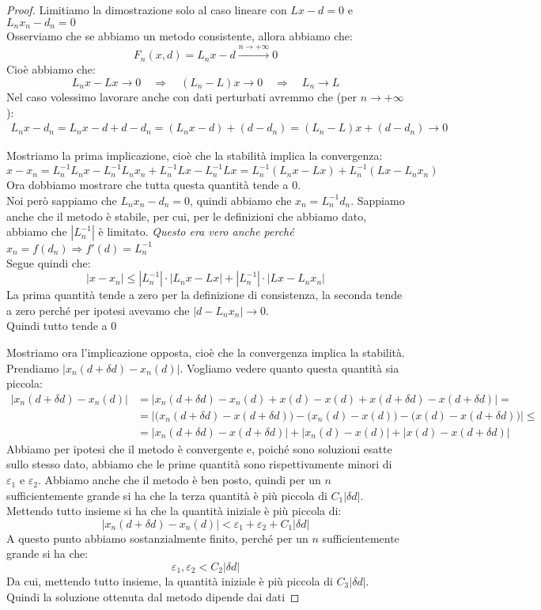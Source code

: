 \documentclass[11pt,a4paper,twoside]{article}
\newcommand{\vareps}{\varepsilon}
\theoremstyle{definition}
\begin{document}
\begin{proof}
	Limitiamo la dimostrazione solo al caso lineare con $Lx-d = 0$ e $L_nx_n - d_n = 0$\\
	Osserviamo che se abbiamo un metodo consistente, allora abbiamo che:
	\[ F_n(x, d) = L_n x - d \xrightarrow{n \to + \infty} 0 \]
	Cioè abbiamo che:
	\[ L_nx - Lx \to 0\quad \Rightarrow \quad (L_n - L)x \to 0 \quad \Rightarrow \quad L_n \to L \]
	Nel caso volessimo lavorare anche con dati perturbati avremmo che (per $n \to +\infty$):
	\begin{align*}
		L_nx - d_n = L_nx -d +d -d_n = (L_nx - d) + (d-d_n) = (L_n - L)x + (d-d_n) \to 0
	\end{align*}

	Mostriamo la prima implicazione, cioè che la stabilità implica la convergenza:
	\[ x-x_n = L^{-1}_nL_nx - L^{-1}_nL_nx_n + L^{-1}_nLx - L_n^{-1}Lx = L^{-1}_n(L_nx - Lx) + L^{-1}_n(Lx - L_nx_n)\]
	Ora dobbiamo mostrare che tutta questa quantità tende a $0$.\\
	Noi però sappiamo che $L_nx_n - d_n = 0$, quindi abbiamo che $x_n = L^{-1}_nd_n$. Sappiamo anche che il metodo è stabile, per cui, per le definizioni che abbiamo dato, abbiamo che $|L_n^{-1}|$ è limitato.
	\textit{Questo era vero anche perché }$x_n = f(d_n) \Rightarrow f'(d) = L^{-1}_n$\\
	Segue quindi che:
	\[ |x-x_n| \leq |L^{-1}_n| \cdot |L_nx - Lx| + |L^{-1}_n| \cdot |Lx - L_nx_n|\]
	La prima quantità tende a zero per la definizione di consistenza, la seconda tende a zero perché per ipotesi avevamo che $|d-L_nx_n| \to 0$.\\
	Quindi tutto tende a $0$

	Mostriamo ora l'implicazione opposta, cioè che la convergenza implica la stabilità.\\
	Prendiamo $|x_n(d + \delta d) - x_n(d)|$. Vogliamo vedere quanto questa quantità sia piccola:
	\begin{align*}
		|x_n(d + \delta d) - x_n(d)| &= |x_n(d + \delta d) - x_n(d) + x(d) - x(d) + x(d + \delta d) - x(d + \delta d)| =\\
		&= {\big |\big(}x_n(d + \delta d) - x(d + \delta d){\big )} - {\big (}x_n(d) - x(d){\big)} - {\big (}x(d) - x(d + \delta d){\big )\big |} \leq\\
		&= |x_n(d + \delta d) -x(d + \delta d)| + |x_n(d) - x(d)| + |x(d) - x(d + \delta d)|
	\end{align*}
	Abbiamo per ipotesi che il metodo è convergente e, poiché sono soluzioni esatte sullo stesso dato, abbiamo che le prime quantità sono rispettivamente minori di $\vareps_1$ e $\vareps_2$.
	Abbiamo anche che il metodo è ben posto, quindi per un $n$ sufficientemente grande si ha che la terza quantità è più piccola di $C_1|\delta d|$. Mettendo tutto insieme si ha che la quantità iniziale è più piccola di:
	\[ |x_n(d + \delta d) - x_n(d)|<\vareps_1 + \vareps_2 + C_1|\delta d| \]
	A questo punto abbiamo sostanzialmente finito, perché per un $n$ sufficientemente grande si ha che:
	\[ \vareps_1, \vareps_2 < C_2|\delta d| \]
	Da cui, mettendo tutto insieme, la quantità iniziale è più piccola di $C_3|\delta d|$. Quindi la soluzione ottenuta dal metodo dipende dai dati
\end{proof}
\end{document}
